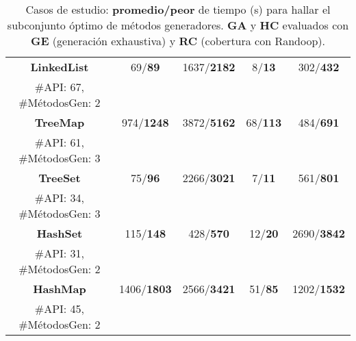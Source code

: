 \begin{table}[H]
\begin{tabular}{cccccc}
\multicolumn{2}{c}{\textbf{LinkedList}}     & 69/\textbf{89}     & 1637/\textbf{2182} & 8/\textbf{13}    & 302/\textbf{432}  \\
\multicolumn{2}{c}{\tiny \#API: 67, \#MétodosGen: 2} & & & & \\

\multicolumn{2}{c}{\textbf{TreeMap}}        & 974/\textbf{1248}  & 3872/\textbf{5162} & 68/\textbf{113}  & 484/\textbf{691}  \\
\multicolumn{2}{c}{\tiny \#API: 61, \#MétodosGen: 3} & & & & \\

\multicolumn{2}{c}{\textbf{TreeSet}}        & 75/\textbf{96}     & 2266/\textbf{3021} & 7/\textbf{11}    & 561/\textbf{801}  \\
\multicolumn{2}{c}{\tiny \#API: 34, \#MétodosGen: 3} & & & & \\

\multicolumn{2}{c}{\textbf{HashSet}}        & 115/\textbf{148}   & 428/\textbf{570}   & 12/\textbf{20}   & 2690/\textbf{3842} \\
\multicolumn{2}{c}{\tiny \#API: 31, \#MétodosGen: 2} & & & & \\

\multicolumn{2}{c}{\textbf{HashMap}}        & 1406/\textbf{1803} & 2566/\textbf{3421} & 51/\textbf{85}   & 1202/\textbf{1532} \\
\multicolumn{2}{c}{\tiny \#API: 45, \#MétodosGen: 2} & & & & \\
\hline
\end{tabular}

\caption{Casos de estudio: \textbf{promedio/peor} de tiempo (s) para hallar el subconjunto óptimo de métodos generadores. \textbf{GA} y \textbf{HC} evaluados con \textbf{GE} (generación exhaustiva) y \textbf{RC} (cobertura con Randoop).}
\label{tab:eficiencia}
\end{table}
